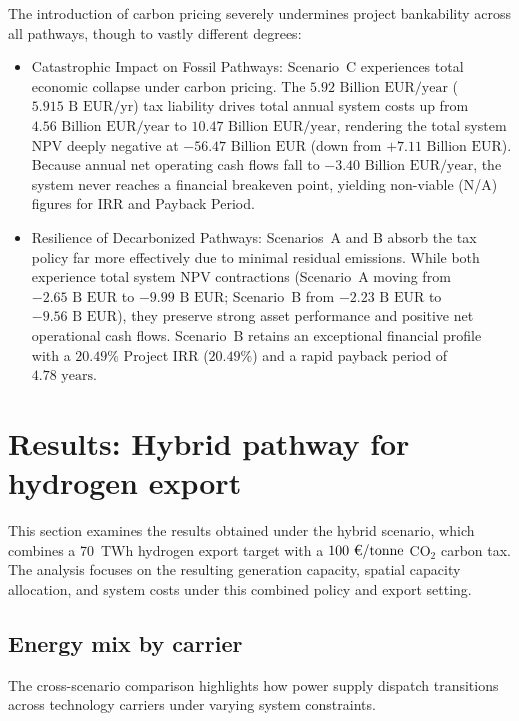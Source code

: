 \documentclass[preprint,12pt]{elsarticle}
\begin{document}
The introduction of carbon pricing severely undermines project bankability across all pathways, though to vastly different degrees:

\begin{itemize}
    \item {Catastrophic Impact on Fossil Pathways:} Scenario~C experiences total economic collapse under carbon pricing. The $5.92\text{~Billion EUR/year}$ ($5.915\text{~B EUR/yr}$) tax liability drives total annual system costs up from $4.56\text{~Billion EUR/year}$ to $10.47\text{~Billion EUR/year}$, rendering the total system NPV deeply negative at $-56.47\text{~Billion EUR}$ (down from $+7.11\text{~Billion EUR}$). Because annual net operating cash flows fall to $-3.40\text{~Billion EUR/year}$, the system never reaches a financial breakeven point, yielding non-viable (N/A) figures for IRR and Payback Period.
    \item {Resilience of Decarbonized Pathways:} Scenarios~A and B absorb the tax policy far more effectively due to minimal residual emissions. While both experience total system NPV contractions (Scenario~A moving from $-2.65\text{~B EUR}$ to $-9.99\text{~B EUR}$; Scenario~B from $-2.23\text{~B EUR}$ to $-9.56\text{~B EUR}$), they preserve strong asset performance and positive net operational cash flows. Scenario~B retains an exceptional financial profile with a $20.49\%$ Project IRR ($20.49\%$) and a rapid payback period of $4.78\text{~years}$.
\end{itemize}

\section{Results: Hybrid pathway for hydrogen export}
\label{sec:results_hybrid_h2} 
This section examines the results obtained under the hybrid scenario, which combines a 70~TWh hydrogen export target with a $100\text{~\texteuro/tonne}$ $\text{CO}_2$ carbon tax. The analysis focuses on the resulting generation capacity, spatial capacity allocation, and system costs under this combined policy and export setting.

\subsection{Energy mix by carrier}
The cross-scenario comparison highlights how power supply dispatch transitions across technology carriers under varying system constraints.
\end{document}

